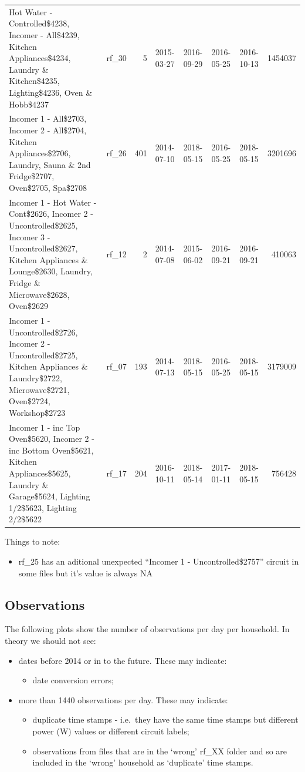 \documentclass[]{article}
\providecommand{\tightlist}{%
  \setlength{\itemsep}{0pt}\setlength{\parskip}{0pt}}
\begin{document}
\begin{longtable}[]{@{}llrllllr@{}}
Hot Water - Controlled\$4238, Incomer - All\$4239, Kitchen
Appliances\$4234, Laundry \& Kitchen\$4235, Lighting\$4236, Oven \&
Hobb\$4237 & rf\_30 & 5 & 2015-03-27 & 2016-09-29 & 2016-05-25 &
2016-10-13 & 1454037\tabularnewline
Incomer 1 - All\$2703, Incomer 2 - All\$2704, Kitchen Appliances\$2706,
Laundry, Sauna \& 2nd Fridge\$2707, Oven\$2705, Spa\$2708 & rf\_26 & 401
& 2014-07-10 & 2018-05-15 & 2016-05-25 & 2018-05-15 &
3201696\tabularnewline
Incomer 1 - Hot Water - Cont\$2626, Incomer 2 - Uncontrolled\$2625,
Incomer 3 - Uncontrolled\$2627, Kitchen Appliances \& Lounge\$2630,
Laundry, Fridge \& Microwave\$2628, Oven\$2629 & rf\_12 & 2 & 2014-07-08
& 2015-06-02 & 2016-09-21 & 2016-09-21 & 410063\tabularnewline
Incomer 1 - Uncontrolled\$2726, Incomer 2 - Uncontrolled\$2725, Kitchen
Appliances \& Laundry\$2722, Microwave\$2721, Oven\$2724, Workshop\$2723
& rf\_07 & 193 & 2014-07-13 & 2018-05-15 & 2016-05-25 & 2018-05-15 &
3179009\tabularnewline
Incomer 1 - inc Top Oven\$5620, Incomer 2 - inc Bottom Oven\$5621,
Kitchen Appliances\$5625, Laundry \& Garage\$5624, Lighting 1/2\$5623,
Lighting 2/2\$5622 & rf\_17 & 204 & 2016-10-11 & 2018-05-14 & 2017-01-11
& 2018-05-15 & 756428\tabularnewline
\bottomrule
\end{longtable}

Things to note:

\begin{itemize}
\tightlist
\item
  rf\_25 has an aditional unexpected ``Incomer 1 - Uncontrolled\$2757''
  circuit in some files but it's value is always NA
\end{itemize}

\subsection{Observations}\label{observations}

The following plots show the number of observations per day per
household. In theory we should not see:

\begin{itemize}
\tightlist
\item
  dates before 2014 or in to the future. These may indicate:

  \begin{itemize}
  \tightlist
  \item
    date conversion errors;
  \end{itemize}
\item
  more than 1440 observations per day. These may indicate:

  \begin{itemize}
  \tightlist
  \item
    duplicate time stamps - i.e.~they have the same time stamps but
    different power (W) values or different circuit labels;
  \item
    observations from files that are in the `wrong' rf\_XX folder and so
    are included in the `wrong' household as `duplicate' time stamps.
  \end{itemize}
\end{itemize}
\end{document}
